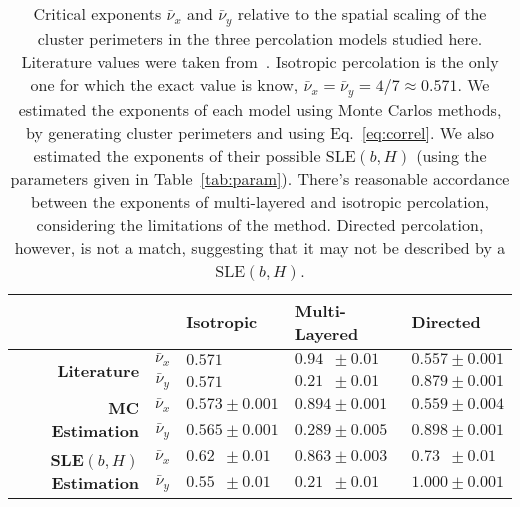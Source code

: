 \begin{table}
\begin{centering}
\begin{tabular}{rclll}
\bottomrule[0.1mm]
\toprule[0.1mm]
                                                                    &                 & \textbf{Isotropic}  & \textbf{Multi-Layered} & \textbf{Directed}   \\
\toprule[0.1mm]
\multirow{2}{*}{\textbf{Literature}}                                & $\bar{\nu}_{x}$ & $0.571$             & $0.94\,\,\,\pm0.01$    & $0.557\pm0.001$     \\[0.1cm]
                                                                    & $\bar{\nu}_{y}$ & $0.571$             & $0.21\,\,\,\pm0.01$    & $0.879\pm0.001$     \\[0.1cm]
\toprule[0.1mm]
\multirow{2}{*}{\textbf{MC Estimation}}                             & $\bar{\nu}_{x}$ & $0.573\pm0.001$     & $0.894\pm0.001$        & $0.559\pm0.004$     \\[0.1cm]
                                                                    & $\bar{\nu}_{y}$ & $0.565\pm0.001$     & $0.289\pm0.005$        & $0.898\pm0.001$     \\[0.1cm]
\toprule[0.1mm]
\multirow{2}{*}{\textbf{SLE}$\left(b,H\right)$ \textbf{Estimation}} & $\bar{\nu}_{x}$ & $0.62\,\,\,\pm0.01$ & $0.863\pm0.003$        & $0.73\,\,\,\pm0.01$ \\[0.1cm]
                                                                    & $\bar{\nu}_{y}$ & $0.55\,\,\,\pm0.01$ & $0.21\,\,\,\pm0.01$    & $1.000\pm0.001$     \\[0.1cm]
\bottomrule[0.1mm]
\toprule[0.1mm]
\end{tabular}
\par\end{centering}
\caption{Critical exponents $\bar{\nu}_x$ and $\bar{\nu}_y$ relative to the
    spatial scaling of the cluster perimeters in the three percolation models
    studied here. Literature values were taken from~\cite{Ziff1986, Dayan1991,
    Owczarek1997}. Isotropic percolation is the only one for which the
    exact value is know, $\bar{\nu}_x= \bar{\nu}_y= 4/7\approx0.571$. We
    estimated the exponents of each model using Monte Carlos methods, by
    generating cluster perimeters and using Eq.~\ref{eq:correl}. We also estimated the
    exponents of their possible SLE$(b,H)$ (using the parameters given in
    Table~\ref{tab:param}). There's reasonable accordance between the exponents
    of multi-layered and isotropic percolation, considering the limitations of
    the method. Directed percolation, however, is not a match, suggesting that
    it may not be described by a SLE$(b,H)$.}
\label{tab:nus}
\end{table}
